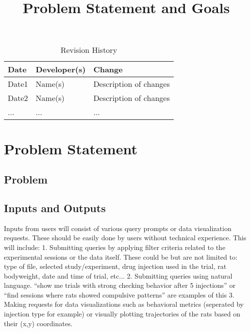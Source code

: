 \documentclass{article}
\title{Problem Statement and Goals\\\progname}
\author{\authname}
\date{}
\begin{document}
\maketitle

\begin{table}[hp]
\caption{Revision History} \label{TblRevisionHistory}
\begin{tabularx}{\textwidth}{llX}
\toprule
\textbf{Date} & \textbf{Developer(s)} & \textbf{Change}\\
\midrule
Date1 & Name(s) & Description of changes\\
Date2 & Name(s) & Description of changes\\
... & ... & ...\\
\bottomrule
\end{tabularx}
\end{table}

\section{Problem Statement}



\subsection{Problem}

\subsection{Inputs and Outputs}


\par{Inputs from users will consist of various query prompts or data visualization requests. These should be easily done
by users without technical experience. This will include: 1. Submitting queries by applying filter criteria related to the experimental sessions or the data itself.
These could be but are not limited to: type of file, selected study/experiment, drug injection used in the trial,
rat bodyweight, date and time of trial, etc...
2. Submitting queries using natural language. “show me trials with strong checking behavior after 5 injections”
or “find sessions where rats showed compulsive patterns” are examples of this
3. Making requests for data visualizations such as behavioral metrics (seperated by injection type for example) or visually plotting trajectories of the rats
based on their (x,y) coordinates.}
\end{document}
